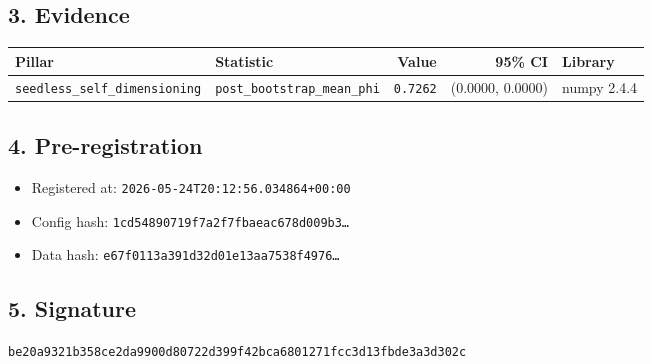 \documentclass{article}
\begin{document}
\subsection*{3. Evidence}
\begin{tabular}{llrrl}\toprule
\textbf{Pillar} & \textbf{Statistic} & \textbf{Value} & \textbf{95\% CI} & \textbf{Library} \\\midrule
\texttt{seedless\_self\_dimensioning} & \texttt{post\_bootstrap\_mean\_phi} & \texttt{0.7262} & (0.0000, 0.0000) & numpy 2.4.4 \\
\bottomrule\end{tabular}
\subsection*{4. Pre-registration}
\begin{itemize}
\item Registered at: \texttt{2026-05-24T20:12:56.034864+00:00}
\item Config hash: \texttt{1cd54890719f7a2f7fbaeac678d009b3\dots}
\item Data hash: \texttt{e67f0113a391d32d01e13aa7538f4976\dots}
\end{itemize}
\subsection*{5. Signature}
\texttt{be20a9321b358ce2da9900d80722d399f42bca6801271fcc3d13fbde3a3d302c}\\
\end{document}
